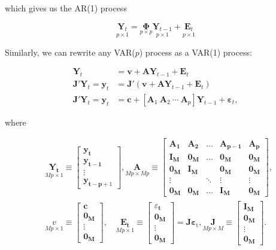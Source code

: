 which gives us the AR(1) process

\[
	\underset{p\times 1}{\bm{Y}_t} = \underset{p\times p}{\bm{\Phi}}\underset{p\times 1}{\bm{Y}_{t-1}} + \underset{p\times 1}{\bm{E}_t}
\]

Similarly, we can rewrite any VAR($p$) process as a VAR(1) process:

\begin{align*}
	\bm{Y}_t &= \bm{v} + \bm{AY}_{t-1} + \bm{E}_t \\
	\bm{J}'\bm{Y}_t = \bm{y}_t &= \bm{J}'(\bm{v} + \bm{AY}_{t-1} + \bm{E}_t) \\ 
	\bm{J}'\bm{Y}_t = \bm{y}_t &= \bm{c} + [\bm{A}_1 \: \bm{A}_2 \: \cdots \: \bm{A}_p]\bm{Y}_{t-1} + \bm{\varepsilon}_t,
\end{align*}

where 

\begin{align*}
& \underset{M p \times 1}{\bm{Y}_{\bm{t}}} \equiv\left[\begin{array}{c}
\bm{y}_{\bm{t}} \\
\bm{y}_{\bm{t}-\bm{1}} \\
\vdots \\
\bm{y}_{\bm{t}-\bm{p}+1}
\end{array}\right], \underset{M p \times M p}{\bm{A}} \equiv\left[\begin{array}{ccccc}
\bm{A}_{\bm{1}} & \bm{A}_{\bm{2}} & \ldots & \bm{A}_{\bm{p}-\bm{1}} & \bm{A}_{\bm{p}} \\
\bm{I}_{\bm{M}} & \bm{0}_{\bm{M}} & \ldots & \bm{0}_{\bm{M}} & \bm{0}_{\bm{M}} \\
\bm{0}_{\bm{M}} & \bm{I}_{\bm{M}} & & \bm{0}_{\bm{M}} & \bm{0}_{\bm{M}} \\
\vdots & & \ddots & \vdots & \vdots \\
\bm{0}_{\bm{M}} & \bm{0}_{\bm{M}} & \ldots & \bm{I}_{\bm{M}} & \bm{0}_{\bm{M}}
\end{array}\right] , \\
& \underset{M p \times 1}{v} \equiv\left[\begin{array}{c}
\bm{c} \\
\bm{0}_{\bm{M}} \\
\vdots \\
\bm{0}_{\bm{M}}
\end{array}\right], \quad \underset{M p \times 1}{\bm{E}_{\bm{t}}} \equiv\left[\begin{array}{c}
\varepsilon_{\bm{t}} \\
\bm{0}_{\bm{M}} \\
\vdots \\
\bm{0}_{\bm{M}}
\end{array}\right]=\bm{J} \bm{\varepsilon}_{\mathrm{t}}, \underset{M p \times M}{\bm{J}} \equiv\left[\begin{array}{c}
\bm{I}_{\bm{M}} \\
\bm{0}_{\bm{M}} \\
\vdots \\
\bm{0}_{\bm{M}}
\end{array}\right] . \\
&
\end{align*}

